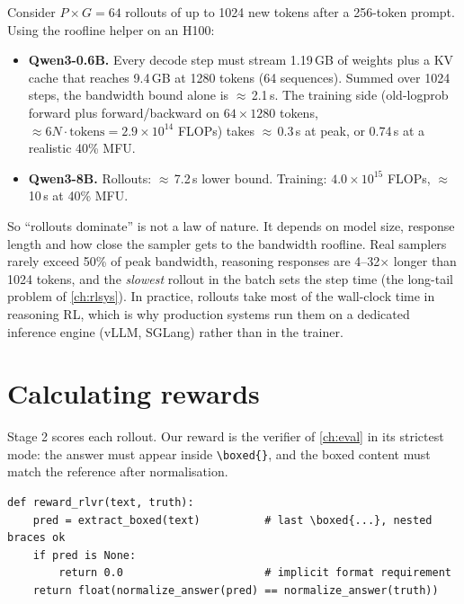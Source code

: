 \begin{systemslens}
Consider $P\times G=64$ rollouts of up to 1024 new tokens after a 256-token prompt.
Using the roofline helper  on an H100:
\begin{itemize}
\item \textbf{Qwen3-0.6B.} Every decode step must stream 1.19\,GB of weights plus a KV
cache that reaches 9.4\,GB at 1280 tokens (64 sequences). Summed over 1024 steps, the
bandwidth bound alone is $\approx$\,2.1\,s. The training side (old-logprob forward plus
forward/backward on $64\times1280$ tokens, $\approx6N\!\cdot\!\text{tokens}=2.9\times10^{14}$
FLOPs) takes $\approx$\,0.3\,s at peak, or 0.74\,s at a realistic 40\% MFU.
\item \textbf{Qwen3-8B.} Rollouts: $\approx$\,7.2\,s lower bound. Training:
$4.0\times10^{15}$ FLOPs, $\approx$\,10\,s at 40\% MFU.
\end{itemize}
So ``rollouts dominate'' is not a law of nature. It depends on model size, response length
and how close the sampler gets to the bandwidth roofline. Real samplers rarely exceed 50\%
of peak bandwidth, reasoning responses are 4--32$\times$ longer than 1024 tokens, and the
\emph{slowest} rollout in the batch sets the step time (the long-tail problem of
\cref{ch:rlsys}). In practice, rollouts take most of the wall-clock time in reasoning RL,
which is why production systems run them on a dedicated inference engine (vLLM, SGLang)
rather than in the trainer.
\end{systemslens}

\section{Calculating rewards}\label{sec:grpo:rewards}

Stage 2 scores each rollout. Our reward is the verifier of \cref{ch:eval} in its strictest
mode: the answer must appear inside \verb|\boxed{}|, and the boxed content must match the
reference after normalisation.

\begin{lstlisting}[caption={The RLVR reward: correct \emph{and} boxed.},label={lst:grpo:reward}]
def reward_rlvr(text, truth):
    pred = extract_boxed(text)          # last \boxed{...}, nested braces ok
    if pred is None:
        return 0.0                      # implicit format requirement
    return float(normalize_answer(pred) == normalize_answer(truth))
\end{lstlisting}

